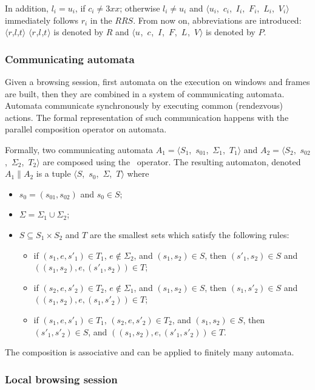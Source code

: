 \documentclass[a4paper,10pt]{article}
\newcommand{\tuple}[1]{\mbox{$\langle$#1$\rangle$}}
\newcommand{\reqmulti}[1][]{
  \ifthenelse{\equal{#1}{}} {\mbox{$\langle r$,$l$,$t\rangle$}}
  {\mbox{$\langle r_{#1}$,$l_{#1}$,$t_{#1}\rangle$}}
}
\newcommand{\resmulti}[1][]{
  \ifthenelse{\equal{#1}{}}{\mbox{$\langle u$, $c$, $I$, $F$, $L$, $V\rangle$}}
  {\mbox{$\langle u_{#1}$, $c_{#1}$, $I_{#1}$, $F_{#1}$, $L_{#1}$, $V_{#1}\rangle$}}
}
\theoremstyle{plain} %
\theoremstyle{definition}
\theoremstyle{remark}
\begin{document}
In addition, $l_i = u_i$, if $c_i \neq 3xx$; otherwise $l_i \neq u_i$ and \resmulti[i] immediately follows $r_i$ in the $RRS$. From now on, abbreviations are introduced: \reqmulti is denoted by $R$ and \resmulti is denoted by $P$.

\subsubsection{Communicating automata}

Given a browsing session, first automata on the execution on windows and frames are built, then they are combined in a system of communicating automata. Automata communicate synchronously by executing common (rendezvous) actions. The formal representation of such communication happens with the parallel composition operator on automata.

Formally, two communicating automata $A_1 = $\tuple{$S_1$, $s_{01}$, $\Sigma_1$, $T_1$} and $A_2 = $\tuple{$S_2$, $s_{02}$, $\Sigma_2$, $T_2$} are composed using the \parallel\ operator. The resulting automaton, denoted $A_1\parallel A_2$ is a tuple \tuple{$S$, $s_0$, $\Sigma$, $T$} where

\begin{itemize}
  \item $s_0 = (s_{01}, s_{02})$ and $s_0 \in S$;
  \item $\Sigma = \Sigma_1 \cup \Sigma_2$;
  \item $S \subseteq S_1 \times S_2$ and $T$ are the smallest sets which satisfy the following rules:
    \begin{itemize}
      \item if $(s_1,e,s'_1) \in T_1$, $e \notin \Sigma_2$, and $(s_1,s_2)\in S$, then $(s'_1,s_2)\in S$ and $((s_1,s_2),e,(s'_1,s_2))\in T$;
      \item if $(s_2,e,s'_2) \in T_2$, $e \notin \Sigma_1$, and $(s_1,s_2)\in S$, then $(s_1,s'_2)\in S$ and $((s_1,s_2),e,(s_1,s'_2))\in T$;
      \item if $(s_1,e,s'_1) \in T_1$, $(s_2,e,s'_2) \in T_2$, and $(s_1,s_2) \in S$, then $(s'_1,s'_2) \in S$, and $((s_1,s_2),e,(s'_1,s'_2)) \in T$.
    \end{itemize}
\end{itemize}

The composition is associative and can be applied to finitely many automata.

\subsubsection{Local browsing session}
\end{document}
